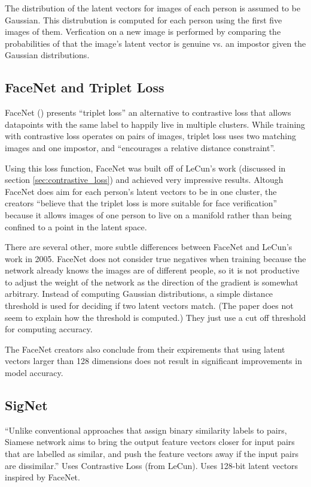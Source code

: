 The distribution of the latent vectors for images of each person is assumed to be Gaussian.
This distrubution is computed for each person using the first five images of them.
Verfication on a new image is performed by comparing the probabilities of that the image's latent vector is genuine vs. an impostor given the Gaussian distributions\cite{LeCun}.

\subsection{FaceNet and Triplet Loss} %
FaceNet (\cite{triple_loss}) presents ``triplet loss'' an alternative to contrastive loss that allows datapoints with the same label to happily live in multiple clusters.
While training with contrastive loss operates on pairs of images, triplet loss uses two matching images and one impostor, and ``encourages a relative distance constraint''\cite{face_net}.

Using this loss function, FaceNet was built off of LeCun's work (discussed in section \ref{sec:contrastive_loss}) and achieved very impressive results\cite{face_net}.
Altough FaceNet does aim for each person's latent vectors to be in one cluster, the creators ``believe that the triplet loss is more suitable for face verification'' because it allows images of one person to live on a manifold rather than being confined to a point in the latent space\cite{face_net}.

There are several other, more subtle differences between FaceNet and LeCun's work in 2005.
FaceNet does not consider true negatives when training because the network already knows the images are of different people, so it is not productive to adjust the weight of the network as the direction of the gradient is somewhat arbitrary.
Instead of computing Gaussian distributions, a simple distance threshold is used for deciding if two latent vectors match.
(The paper does not seem to explain how the threshold is computed.)
They just use a cut off threshold for computing accuracy.

The FaceNet creators also conclude from their expirements that using latent vectors larger than 128 dimensions does not result in significant improvements in model accuracy\cite{FaceNet}.

\subsection{SigNet}
``Unlike conventional approaches that assign
binary similarity labels to pairs, Siamese network aims to bring
the output feature vectors closer for input pairs that are labelled
as similar, and push the feature vectors away if the input pairs
are dissimilar.''
Uses Contrastive Loss (from LeCun).
Uses 128-bit latent vectors inspired by FaceNet.

